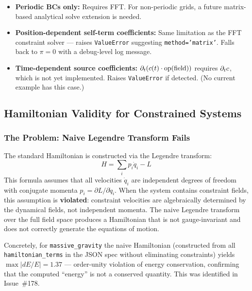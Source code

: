\begin{itemize}
  \item \textbf{Periodic BCs only:} Requires FFT. For non-periodic grids, a future
    matrix-based analytical solve extension is needed.
  \item \textbf{Position-dependent self-term coefficients:} Same limitation as the FFT
    constraint solver --- raises \texttt{ValueError} suggesting \texttt{method='matrix'}.
    Falls back to $\pi = 0$ with a debug-level log message.
  \item \textbf{Time-dependent source coefficients:} $\partial_t(c(t) \cdot \mathrm{op}(\text{field}))$ requires
    $\partial_t c$, which is not yet implemented. Raises \texttt{ValueError} if detected.
    (No current example has this case.)
\end{itemize}

\subsection{Hamiltonian Validity for Constrained Systems}
\label{sec:cf-hamiltonian}

\subsubsection{The Problem: Naive Legendre Transform Fails}
\label{sec:cf-hamiltonian-problem}

The standard Hamiltonian is constructed via the Legendre transform:
\begin{equation}
  H = \sum_i p_i \dot{q}_i - L
  \label{eq:cf-naive-legendre}
\end{equation}
This formula assumes that all velocities $\dot{q}_i$ are independent
degrees of freedom with conjugate momenta $p_i = \partial L / \partial \dot{q}_i$.
When the system contains constraint fields, this assumption is \textbf{violated}:
constraint velocities are algebraically determined by the dynamical fields, not
independent momenta. The naive Legendre transform over the full field space
produces a Hamiltonian that is not gauge-invariant and does not correctly
generate the equations of motion.

Concretely, for \texttt{massive\_gravity} the naive Hamiltonian (constructed from
all \texttt{hamiltonian\_terms} in the JSON spec without eliminating constraints)
yields $\max |dE/E| = 1.37$ --- order-unity violation of energy conservation,
confirming that the computed ``energy'' is not a conserved quantity. This was
identified in Issue~\#178.

